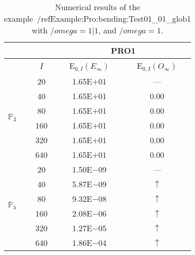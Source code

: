\begin{table}[H]
\caption{Numerical results of the example~/ref{Example:Pro:bending:Test01_01_glob1} with $/omega=1|1$, and $/omega=1$.}
\setlength{\tabcolsep}{5pt}
\centering
\begin{tabular}{@{}l c c c@{}}
\toprule
 &  & \multicolumn{2}{c}{PRO1}\\
\midrule
 & $I$ & E$_{0,I}(E_{\infty})$ & E$_{0,I}(O_{\infty})$\\
\midrule
\multirow{6}{*}{$\mathbb{P}_{3}$}
 & 20 & 1.65E$+$01 & ---\\
 & 40 & 1.65E$+$01 & 0.00\\
 & 80 & 1.65E$+$01 & 0.00\\
 & 160 & 1.65E$+$01 & 0.00\\
 & 320 & 1.65E$+$01 & 0.00\\
 & 640 & 1.65E$+$01 & 0.00\\
\midrule
\multirow{6}{*}{$\mathbb{P}_{5}$}
 & 20 & 1.50E$-$09 & ---\\
 & 40 & 5.87E$-$09 & $\uparrow$\\
 & 80 & 9.32E$-$08 & $\uparrow$\\
 & 160 & 2.08E$-$06 & $\uparrow$\\
 & 320 & 1.27E$-$05 & $\uparrow$\\
 & 640 & 1.86E$-$04 & $\uparrow$\\
\bottomrule
\end{tabular}
\label{Table:PRO:test_01_01_test9_pro1}
\end{table}
